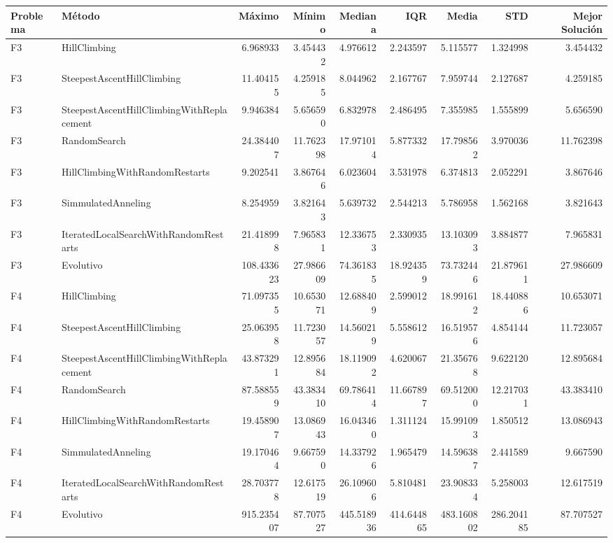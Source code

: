 \begin{tabular}{llrrrrrrr}
\toprule
Problema & Método & Máximo & Mínimo & Mediana & IQR & Media & STD & Mejor Solución \\
\midrule
F3 & HillClimbing & 6.968933 & 3.454432 & 4.976612 & 2.243597 & 5.115577 & 1.324998 & 3.454432 \\
F3 & SteepestAscentHillClimbing & 11.404155 & 4.259185 & 8.044962 & 2.167767 & 7.959744 & 2.127687 & 4.259185 \\
F3 & SteepestAscentHillClimbingWithReplacement & 9.946384 & 5.656590 & 6.832978 & 2.486495 & 7.355985 & 1.555899 & 5.656590 \\
F3 & RandomSearch & 24.384407 & 11.762398 & 17.971014 & 5.877332 & 17.798562 & 3.970036 & 11.762398 \\
F3 & HillClimbingWithRandomRestarts & 9.202541 & 3.867646 & 6.023604 & 3.531978 & 6.374813 & 2.052291 & 3.867646 \\
F3 & SimmulatedAnneling & 8.254959 & 3.821643 & 5.639732 & 2.544213 & 5.786958 & 1.562168 & 3.821643 \\
F3 & IteratedLocalSearchWithRandomRestarts & 21.418998 & 7.965831 & 12.336753 & 2.330935 & 13.103093 & 3.884877 & 7.965831 \\
F3 & Evolutivo & 108.433623 & 27.986609 & 74.361835 & 18.924359 & 73.732446 & 21.879611 & 27.986609 \\
F4 & HillClimbing & 71.097355 & 10.653071 & 12.688409 & 2.599012 & 18.991612 & 18.440886 & 10.653071 \\
F4 & SteepestAscentHillClimbing & 25.063958 & 11.723057 & 14.560219 & 5.558612 & 16.519576 & 4.854144 & 11.723057 \\
F4 & SteepestAscentHillClimbingWithReplacement & 43.873291 & 12.895684 & 18.119092 & 4.620067 & 21.356768 & 9.622120 & 12.895684 \\
F4 & RandomSearch & 87.588559 & 43.383410 & 69.786414 & 11.667897 & 69.512000 & 12.217031 & 43.383410 \\
F4 & HillClimbingWithRandomRestarts & 19.458907 & 13.086943 & 16.043460 & 1.311124 & 15.991093 & 1.850512 & 13.086943 \\
F4 & SimmulatedAnneling & 19.170464 & 9.667590 & 14.337926 & 1.965479 & 14.596387 & 2.441589 & 9.667590 \\
F4 & IteratedLocalSearchWithRandomRestarts & 28.703778 & 12.617519 & 26.109606 & 5.810481 & 23.908334 & 5.258003 & 12.617519 \\
F4 & Evolutivo & 915.235407 & 87.707527 & 445.518936 & 414.644865 & 483.160802 & 286.204185 & 87.707527 \\

\end{tabular}
